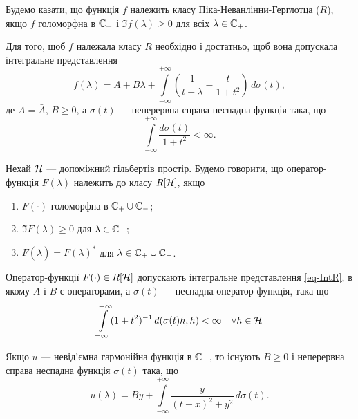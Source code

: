 \begin{definition}
	Будемо казати, що функція $f$ належить класу Піка-Неванлінни-Герглотца ($R$), якщо $f$ голоморфна в $\mathbb{C}_+$ і $\Im f(\lambda)\ge 0$ для всіх $\lambda \in \mathbb{C}_+$.
\end{definition}

\begin{theorem} \label{th-IntR}
	Для того, щоб $f$ належала класу $R$ необхідно і достатньо, щоб вона допускала інтегральне представлення
	\begin{equation}\label{eq-IntR}
		f(\lambda) = A+B\lambda+\int\limits_{-\infty}^{+\infty} \left( \frac{1}{t-\lambda} - \frac{t}{1+t^2} \right)\,d\sigma(t),
	\end{equation}
	де $A=\bar{A}$, $B\ge 0$, а $\sigma(t)$ --- неперервна справа неспадна функція така, що
	\begin{equation*}
		\int\limits_{-\infty}^{+\infty} \frac{d\sigma(t)}{1+t^2}<\infty.
	\end{equation*}
\end{theorem}

\begin{definition}
	Нехай $\mathcal{H}$ --- допоміжний гільбертів простір. Будемо говорити, що оператор-функція $F(\lambda)$ належить до класу $R[\mathcal{H}]$, якщо
	\begin{enumerate}
		\item $F(\cdot)$ голоморфна в $\mathbb{C}_+\cup\mathbb{C}_-$;
		\item $\Im F(\lambda)\ge0$ для $\lambda\in\mathbb{C}_-$;
		\item $F(\bar{\lambda}) = F(\lambda)^*$ для $\lambda\in\mathbb{C}_+\cup\mathbb{C}_-$.
	\end{enumerate}
\end{definition}

Оператор-функції $F(\cdot)\in R[\mathcal{H}]$ допускають інтегральне представлення \eqref{eq-IntR}, в якому $A$ і $B$ є операторами, а $\sigma(t)$ --- неспадна оператор-функція, така що
\begin{equation*}
	\int\limits_{-\infty}^{+\infty} (1+t^2)^{-1}\,d(\sigma(t)h,h) < \infty \quad \forall h\in\mathcal{H}
\end{equation*}

\begin{corollary}
	Якщо $u$ --- невід'ємна гармонійна функція в $\mathbb{C}_+$, то існують $B\ge 0$ і неперервна справа неспадна функція $\sigma(t)$ така, що
	\begin{equation} \label{eq-ImR}
		u(\lambda)=By + \int\limits_{-\infty}^{+\infty} \frac{y}{(t-x)^2+y^2}\,d\sigma(t).
	\end{equation}
\end{corollary}

